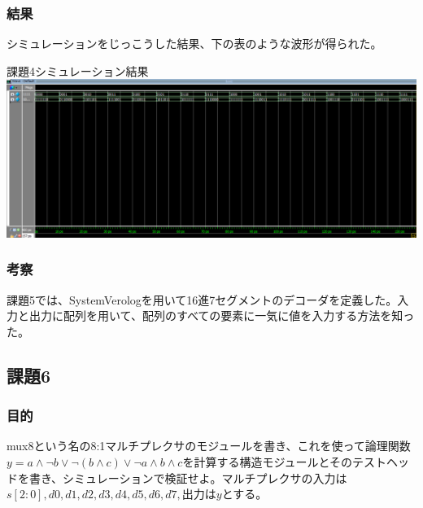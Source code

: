 \documentclass[a4paper]{jarticle}
\begin{document}
\subsubsection{結果}
シミュレーションをじっこうした結果、下の表のような波形が得られた。
\begin{center}
	課題4シミュレーション結果
	\includegraphics[width=15cm]{5-m.PNG}
\end{center}
\subsubsection{考察}
課題5では、SystemVerologを用いて16進7セグメントのデコーダを定義した。入力と出力に配列を用いて、配列のすべての要素に一気に値を入力する方法を知った。
\subsection{課題6}
\subsubsection{目的}
mux8という名の8:1マルチプレクサのモジュールを書き、これを使って論理関数$y = a \land \lnot b \lor \lnot \left( b \land c \right) \lor \lnot a \land b \land c$を計算する構造モジュールとそのテストヘッドを書き、シミュレーションで検証せよ。マルチプレクサの入力は$s\left[ 2:0 \right],d0,d1,d2,d3,d4,d5,d6,d7,$出力は$y$とする。
\end{document}
